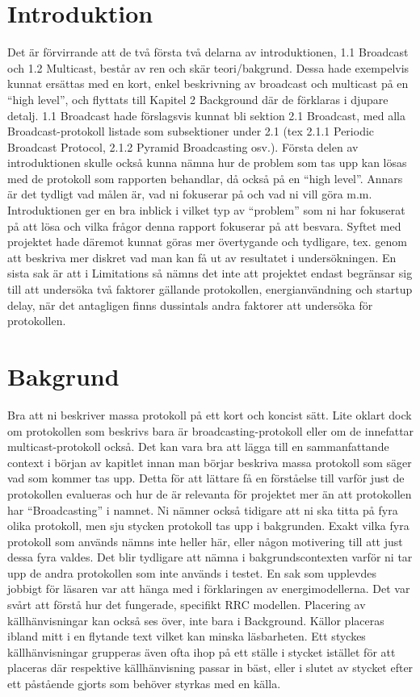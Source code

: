 \documentclass{article}
\begin{document}
\section{Introduktion}
Det är förvirrande att de två första två delarna av introduktionen, 1.1 Broadcast och 1.2 Multicast, består av ren och skär teori/bakgrund. Dessa hade exempelvis kunnat ersättas med en kort, enkel beskrivning av broadcast och multicast på en “high level”, och flyttats till Kapitel 2 Background där de förklaras i djupare detalj. 1.1 Broadcast hade förslagsvis kunnat bli sektion 2.1 Broadcast, med alla Broadcast-protokoll listade som subsektioner under 2.1 (tex 2.1.1 Periodic Broadcast Protocol, 2.1.2 Pyramid Broadcasting osv.). Första delen av introduktionen skulle också kunna nämna hur de problem som tas upp kan lösas med de protokoll som rapporten behandlar, då också på en “high level”. Annars är det tydligt vad målen är, vad ni fokuserar på och vad ni vill göra m.m. Introduktionen ger en bra inblick i vilket typ av “problem” som ni har fokuserat på att lösa och vilka frågor denna rapport fokuserar på att besvara. Syftet med projektet hade däremot kunnat göras mer övertygande och tydligare, tex. genom att beskriva mer diskret vad man kan få ut av resultatet i undersökningen. En sista sak är att i Limitations så nämns det inte att projektet endast begränsar sig till att undersöka två faktorer gällande protokollen, energianvändning och startup delay, när det antagligen finns dussintals andra faktorer att undersöka för protokollen.


\section{Bakgrund}
Bra att ni beskriver massa protokoll på ett kort och koncist sätt. Lite oklart dock om protokollen som beskrivs bara är broadcasting-protokoll eller om de innefattar multicast-protokoll också. Det kan vara bra att lägga till en sammanfattande context i början av kapitlet innan man börjar beskriva massa protokoll som säger vad som kommer tas upp. Detta för att lättare få en förståelse till varför just de protokollen evalueras och hur de är relevanta för projektet mer än att protokollen har “Broadcasting” i namnet. Ni nämner också tidigare att ni ska titta på fyra olika protokoll, men sju stycken protokoll tas upp i bakgrunden. Exakt vilka fyra protokoll som används nämns inte heller här, eller någon motivering till att just dessa fyra valdes. Det blir tydligare att nämna i bakgrundscontexten varför ni tar upp de andra protokollen som inte används i testet. En sak som upplevdes jobbigt för läsaren var att hänga med i förklaringen av energimodellerna. Det var svårt att förstå hur det fungerade, specifikt RRC modellen. 
Placering av källhänvisningar kan också ses över, inte bara i Background. Källor placeras ibland mitt i en flytande text vilket kan minska läsbarheten. Ett styckes källhänvisningar grupperas även ofta ihop på ett ställe i stycket istället för att placeras där respektive källhänvisning passar in bäst, eller i slutet av stycket efter ett påstående gjorts som behöver styrkas med en källa.
\end{document}
